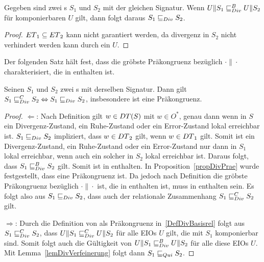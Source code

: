 \begin{lem}
\label{lemDivVerfeinerung}
  Gegeben sind zwei \EIO{}s $S_1$ und $S_2$ mit der gleichen Signatur. Wenn
  $U\|S_1\sqsubseteq _{Div}^B{} U\|S_2$ für komponierbaren $U$ gilt, dann folgt daraus
  $S_1\sqsubseteq _{Div}{} S_2$.
\end{lem}

\begin{proof}
  \scriptsize\textcolor{lgray}{$ET{}_1\subseteq ET{}_2$ kann nicht garantiert
  werden, da divergenz in $S_2$ nicht verhindert werden kann durch ein $U$.}
  \normalsize
\end{proof}

Der folgenden Satz hält fest, dass \DRel{} die gröbste Präkongruenz bezüglich
$\cdot\|\cdot$ charakterisiert, die in \DBRel{} enthalten ist.

\begin{satz}
\label{satzDivFullAbst}
  Seinen $S_1$ und $S_2$ zwei \EIO{}s mit derselben Signatur. Dann gilt $S_1
  \sqsubseteq _{Div}^C{} S_2\Leftrightarrow S_1\sqsubseteq _{Div}{} S_2$, insbesondere ist \DRel{} eine
  Präkongruenz.
\end{satz}

\begin{proof}
  \glqq{}$\Leftarrow$\grqq{}: Nach Definition gilt $w\in DT{}(S)$ mit $w\in
  O^*$, genau dann wenn in $S$ ein Divergenz-Zustand, ein Ruhe-Zustand oder ein
  Error-Zustand lokal erreichbar ist. $S_1\sqsubseteq _{Div} S_2$ impliziert, dass
  $w\in DT{}_2$ gilt, wenn $w\in DT{}_1$ gilt. Somit ist ein Divergenz-Zustand,
  ein Ruhe-Zustand oder ein Error-Zustand nur dann in $S_1$ lokal erreichbar,
  wenn auch ein solcher in $S_2$ lokal erreichbar ist. Daraus folgt, dass
  $S_1\sqsubseteq _{Div}^B S_2$ gilt. Somit ist \DRel{} in \DBRel{} enthalten. In
  Proposition~\ref{propDivPrae} wurde festgestellt, dass \DRel{} eine
  Präkongruenz ist. Da jedoch \DCRel{} nach Definition die gröbste Präkongruenz
  bezüglich $\cdot\|\cdot$ ist, die in \DBRel{} enthalten ist, muss \DRel{} in
  \DCRel{} enthalten sein. Es folgt also aus $S_1\sqsubseteq _{Div} S_2$,
  dass auch der relationale Zusammenhang $S_1\sqsubseteq _{Div}^C S_2$ gilt.

  \glqq{}$\Rightarrow$\grqq{}: Durch die Definition von \DCRel{} als
  Präkongruenz in~\ref{DefDivBasisrel} folgt aus $S_1\sqsubseteq _{Div}^C{} S_2$, dass
  $U\|S_1\sqsubseteq _{Div}^C U\|S_2$ für alle EIOs $U$ gilt, die mit $S_1$ komponierbar sind.
  Somit folgt auch die Gültigkeit von $U\|S_1\sqsubseteq _{Div}^B U\|S_2$ für alle diese EIOs
  $U$. Mit Lemma~\ref{lemDivVerfeinerung} folgt dann $S_1\sqsubseteq _{Qui}{} S_2$.
\end{proof}

